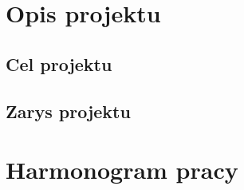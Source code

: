 


                   

\chapter{Opis projektu}
\section{Cel projektu}
  

\section{Zarys projektu}
  

\chapter{Harmonogram pracy}
	










